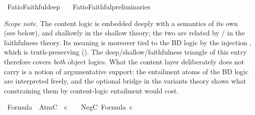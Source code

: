 %
\begin{isabellebody}%
%
%
\isadelimdocument
%
\endisadelimdocument
%
\isatagdocument
%
\isamarkuptrue%
%
\endisatagdocument
{\isafolddocument}%
%
\isadelimdocument
%
\endisadelimdocument
%
\isadelimtheory
%
\endisadelimtheory
%
\isatagtheory
{}\isamarkupfalse%
\ FatioFaithful{\isacharunderscore}{\kern0pt}deep\isanewline
\ \ \ FatioFaithful{\isacharunderscore}{\kern0pt}preliminaries\isanewline
{}%
\endisatagtheory
{\isafoldtheory}%
%
\isadelimtheory
%
\endisadelimtheory
%
\isadelimdocument
%
\endisadelimdocument
%
\isatagdocument
%
\isamarkuptrue%
%
\endisatagdocument
{\isafolddocument}%
%
\isadelimdocument
%
\endisadelimdocument
%
\begin{isamarkuptext}%
\emph{Scope note.} The content logic is embedded deeply with a semantics of its own
(see below), and shallowly in the shallow theory; the two are related by
/ in the faithfulness theory. Its meaning is moreover tied
to the BD logic by the injection , which is truth-preserving
(). The deep/shallow/faithfulness triangle of this entry therefore
covers \emph{both} object logics. What the content layer deliberately does not carry is
a notion of argumentative support: the entailment atoms of the BD logic are
interpreted freely, and the optional bridge in the variants theory shows what
constraining them by content-logic entailment would cost.%
\end{isamarkuptext}\isamarkuptrue%
\isamarkupfalse%
\ Formula\ {\isacharequal}{\kern0pt}\ AtmC\ {\isasymS}\ {\isacharparenleft}{\kern0pt}{\isachardoublequoteopen}{\isacharunderscore}{\kern0pt}\isactrlsup c{\isachardoublequoteclose}\ {\isacharbrackleft}{\kern0pt}{}{}{}{}{\isacharbrackright}{\kern0pt}\ {}{}{}{\isacharparenright}{\kern0pt}\ {\isacharbar}{\kern0pt}\ NegC\ Formula\ {\isacharparenleft}{\kern0pt}{\isachardoublequoteopen}{\isasymnot}\isactrlsup c{\isacharunderscore}{\kern0pt}{\isachardoublequoteclose}\ {\isacharbrackleft}{\kern0pt}{}{}{\isacharbrackright}{\kern0pt}\ {}{}{\isacharparenright}{\kern0pt}\isanewline

\end{isabellebody}
